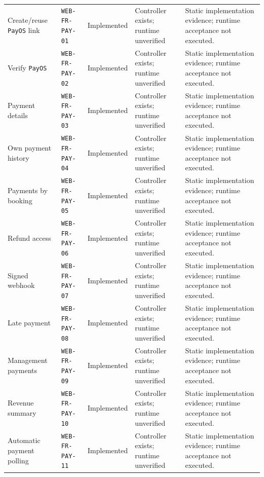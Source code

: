 \begin{longtable}{@{}P{0.19000\SRSWidth}P{0.18000\SRSWidth}P{0.15000\SRSWidth}P{0.20000\SRSWidth}P{0.28000\SRSWidth}@{}}
Create/\allowbreak{}reuse \texttt{Pay\allowbreak{}OS} link & \texttt{WEB-\allowbreak{}FR-\allowbreak{}PAY-\allowbreak{}01} & Implemented & Controller exists; runtime unverified & Static implementation evidence; runtime acceptance not executed. \\[3pt]
Verify \texttt{Pay\allowbreak{}OS} & \texttt{WEB-\allowbreak{}FR-\allowbreak{}PAY-\allowbreak{}02} & Implemented & Controller exists; runtime unverified & Static implementation evidence; runtime acceptance not executed. \\[3pt]
Payment details & \texttt{WEB-\allowbreak{}FR-\allowbreak{}PAY-\allowbreak{}03} & Implemented & Controller exists; runtime unverified & Static implementation evidence; runtime acceptance not executed. \\[3pt]
Own payment history & \texttt{WEB-\allowbreak{}FR-\allowbreak{}PAY-\allowbreak{}04} & Implemented & Controller exists; runtime unverified & Static implementation evidence; runtime acceptance not executed. \\[3pt]
Payments by booking & \texttt{WEB-\allowbreak{}FR-\allowbreak{}PAY-\allowbreak{}05} & Implemented & Controller exists; runtime unverified & Static implementation evidence; runtime acceptance not executed. \\[3pt]
Refund access & \texttt{WEB-\allowbreak{}FR-\allowbreak{}PAY-\allowbreak{}06} & Implemented & Controller exists; runtime unverified & Static implementation evidence; runtime acceptance not executed. \\[3pt]
Signed webhook & \texttt{WEB-\allowbreak{}FR-\allowbreak{}PAY-\allowbreak{}07} & Implemented & Controller exists; runtime unverified & Static implementation evidence; runtime acceptance not executed. \\[3pt]
Late payment & \texttt{WEB-\allowbreak{}FR-\allowbreak{}PAY-\allowbreak{}08} & Implemented & Controller exists; runtime unverified & Static implementation evidence; runtime acceptance not executed. \\[3pt]
Management payments & \texttt{WEB-\allowbreak{}FR-\allowbreak{}PAY-\allowbreak{}09} & Implemented & Controller exists; runtime unverified & Static implementation evidence; runtime acceptance not executed. \\[3pt]
Revenue summary & \texttt{WEB-\allowbreak{}FR-\allowbreak{}PAY-\allowbreak{}10} & Implemented & Controller exists; runtime unverified & Static implementation evidence; runtime acceptance not executed. \\[3pt]
Automatic payment polling & \texttt{WEB-\allowbreak{}FR-\allowbreak{}PAY-\allowbreak{}11} & Implemented & Controller exists; runtime unverified & Static implementation evidence; runtime acceptance not executed. \\[3pt]

\end{longtable}
